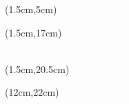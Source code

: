 \begin{latin}
    \fontsize{13.2pt}{15.8pt}\selectfont

    \begin{textblock*}{12cm}(1.5cm,5cm)
        \textcolor{white}{\textbf{{\LatinDegreeAbbr} {\LatinType}}}

        \vspace{\baselineskip}
        \textcolor{white}{\large \textbf{\LatinTitle}}

        \vspace{\baselineskip}
        \textcolor{white}{\textbf{\LatinName}}
    \end{textblock*}

    \begin{textblock*}{12cm}(1.5cm,17cm)
        \textcolor{white}{Supervised by \\ \textbf{{\LatinSupervisor}, PhD}}
    \end{textblock*}

    \begin{textblock*}{12cm}(1.5cm,20.5cm)
        \textcolor{white}{{\LatinSchool} - {\LatinDepartment}}
    \end{textblock*}

    \begin{textblock*}{3cm}(12cm,22cm)
        \textcolor{BlueGray}{\normalsize \textbf{\LatinDate}}
    \end{textblock*}
\end{latin}
